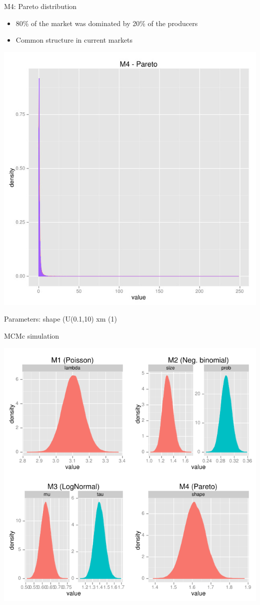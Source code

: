 \documentclass[12pt, handout=show,notes=show]{beamer}
\begin{document}
\begin{frame}{M4: Pareto distribution}
\begin{itemize}
\item 80\% of the market was dominated by 20\% of the producers
\item Common structure in current markets
\end{itemize}
\begin{center}
		\includegraphics[height=0.5\textwidth]{./pareto.jpg}
		\vfill
	
\end{center}	
\begin{center}
\tiny Parameters: shape (U(0.1,10) xm (1)
\end{center}
\end{frame}


\begin{frame}{MCMc simulation}
 \begin{center}
 \includegraphics[height=0.6\textwidth]{./pareto2.png}
 \end{center}

\end{frame}
\end{document}
